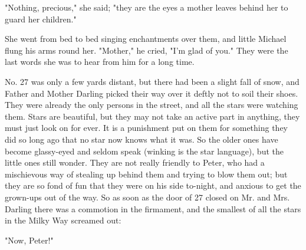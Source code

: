 "Nothing, precious," she said; "they are the eyes a mother leaves behind
her to guard her children."


She went from bed to bed singing enchantments over them, and little
Michael flung his arms round her. "Mother," he cried, "I'm glad of you."
They were the last words she was to hear from him for a long time.


No. 27 was only a few yards distant, but there had been a slight fall of
snow, and Father and Mother Darling picked their way over it deftly not to
soil their shoes. They were already the only persons in the street, and
all the stars were watching them. Stars are beautiful, but they may not
take an active part in anything, they must just look on for ever. It is a
punishment put on them for something they did so long ago that no star now
knows what it was. So the older ones have become glassy-eyed and seldom
speak (winking is the star language), but the little ones still wonder.
They are not really friendly to Peter, who had a mischievous way of
stealing up behind them and trying to blow them out; but they are so fond
of fun that they were on his side to-night, and anxious to get the
grown-ups out of the way. So as soon as the door of 27 closed on Mr. and
Mrs. Darling there was a commotion in the firmament, and the smallest of
all the stars in the Milky Way screamed out:


"Now, Peter!"

